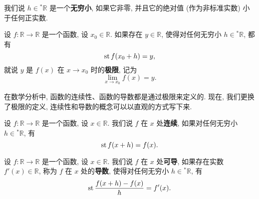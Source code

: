 


\begin{definition}
    我们说 $h \in {}^* \mathbb{R}$ 是一个\textbf{无穷小},
    如果它非零, 并且它的绝对值 (作为非标准实数) 小于任何正实数.
\end{definition}

\begin{definition} [极限]
    设 $f \colon \mathbb{R} \to \mathbb{R}$ 是一个函数, 设 $x_0 \in \mathbb{R}$.
    如果存在 $y \in \mathbb{R}$, 使得对任何无穷小 $h \in {}^* \mathbb{R}$, 都有
    \[
        \operatorname{st} f (x_0 + h) = y,
    \]
    就说 $y$ 是 $f (x)$ 在 $x \to x_0$ 时的\textbf{极限}, 记为
    \[
        \lim _{x \to x_0} f (x) = y.
    \]
\end{definition}

在数学分析中, 函数的连续性、函数的导数都是通过极限来定义的.
现在, 我们更换了极限的定义,
连续性和导数的概念可以以直观的方式写下来.

\begin{definition}
    设 $f \colon \mathbb{R} \to \mathbb{R}$ 是一个函数, 设 $x \in \mathbb{R}$.
    我们说 $f$ 在 $x$ 处\textbf{连续}, 如果对任何无穷小 $h \in {}^* \mathbb{R}$, 有
    \[
        \operatorname{st} f (x + h) = f (x).
    \]
\end{definition}

\begin{definition}
    设 $f \colon \mathbb{R} \to \mathbb{R}$ 是一个函数, 设 $x \in \mathbb{R}$.
    我们说 $f$ 在 $x$ 处\textbf{可导},
    如果存在实数 $f' (x) \in \mathbb{R}$, 称为 $f$ 在 $x$ 处的\textbf{导数},
    使得对任何无穷小 $h \in {}^* \mathbb{R}$, 有
    \[
        \operatorname{st} \frac{f (x + h) - f(x)}{h} = f' (x).
    \]
\end{definition}


